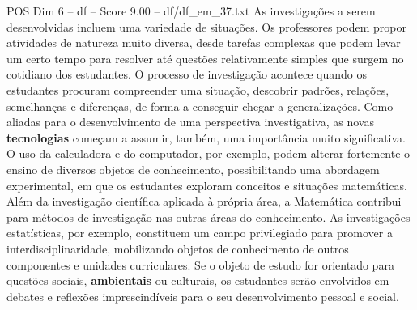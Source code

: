 \begin{textsample}{POS Dim 6 – df – Score 9.00 – df/df\_em\_37.txt}
As investigações a serem desenvolvidas incluem uma variedade de situações.
Os professores podem propor atividades de natureza muito diversa, desde tarefas complexas que podem levar um certo tempo para resolver até questões relativamente simples que surgem no cotidiano dos estudantes.
O processo de investigação acontece quando os estudantes procuram compreender uma situação, descobrir padrões, relações, semelhanças e diferenças, de forma a conseguir chegar a generalizações.
Como aliadas para o desenvolvimento de uma perspectiva investigativa, as novas \textbf{tecnologias} começam a assumir, também, uma importância muito significativa.
O uso da calculadora e do computador, por exemplo, podem alterar fortemente o ensino de diversos objetos de conhecimento, possibilitando uma abordagem experimental, em que os estudantes exploram conceitos e situações matemáticas.
Além da investigação científica aplicada à própria área, a Matemática contribui para métodos de investigação nas outras áreas do conhecimento.
As investigações estatísticas, por exemplo, constituem um campo privilegiado para promover a interdisciplinaridade, mobilizando objetos de conhecimento de outros componentes e unidades curriculares.
Se o objeto de estudo for orientado para questões sociais, \textbf{ambientais} ou culturais, os estudantes serão envolvidos em debates e reflexões imprescindíveis para o seu desenvolvimento pessoal e social.

\end{textsample}
